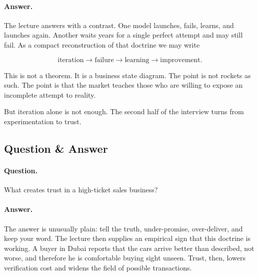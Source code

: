 \paragraph{Answer.} The lecture answers with a contrast. One model launches, fails, learns, and launches again. Another waits years for a single perfect attempt and may still fail. As a compact reconstruction of that doctrine we may write

\begin{equation}
\text{iteration}\to\text{failure}\to\text{learning}\to\text{improvement}.
\end{equation}

This is not a theorem. It is a business state diagram. The point is not rockets as such. The point is that the market teaches those who are willing to expose an incomplete attempt to reality.

\begin{figure}
\centering
{}
\end{figure}

But iteration alone is not enough. The second half of the interview turns from experimentation to trust.

\subsection{Question \& Answer}

\paragraph{Question.} What creates trust in a high-ticket sales business?

\paragraph{Answer.} The answer is unusually plain: tell the truth, under-promise, over-deliver, and keep your word. The lecture then supplies an empirical sign that this doctrine is working. A buyer in Dubai reports that the cars arrive better than described, not worse, and therefore he is comfortable buying sight unseen. Trust, then, lowers verification cost and widens the field of possible transactions.

